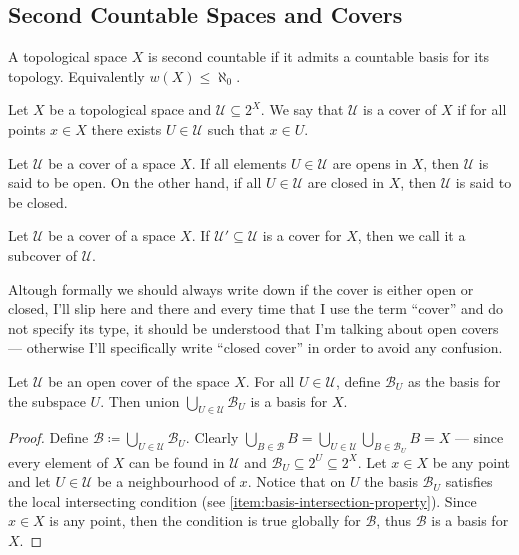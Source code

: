 \subsection{Second Countable Spaces and Covers}

\begin{definition}\label{def: second countable}
A topological space \(X\) is second countable if it admits a countable basis
for its topology. Equivalently \(w(X) \leq \aleph_0\).
\end{definition}

\begin{definition}[Cover]\label{def: cover}
Let \(X\) be a topological space and \(\mathcal U \subseteq 2^X\). We say that
\(\mathcal U\) is a cover of \(X\) if for all points \(x \in X\) there exists
\(U \in \mathcal U\) such that \(x \in U\).
\end{definition}

\begin{definition}
Let \(\mathcal U\) be a cover of a space \(X\). If all elements \(U \in
\mathcal U\) are opens in \(X\), then \(\mathcal U\) is said to be open. On
the other hand, if all \(U \in \mathcal U\) are closed in \(X\), then
\(\mathcal U\) is said to be closed.
\end{definition}

\begin{definition}[Subcover]
Let \(\mathcal U\) be a cover of a space \(X\). If \(\mathcal U' \subseteq
\mathcal U\) is a cover for \(X\), then we call it a subcover of \(\mathcal
U\).
\end{definition}

Altough formally we should always write down if the cover is either open or
closed, I'll slip here and there and every time that I use the term ``cover''
and do not specify its type, it should be understood that I'm talking about open
covers --- otherwise I'll specifically write ``closed cover'' in order to avoid
any confusion.

\begin{proposition}
\label{prop:union-cover-basis}
Let \(\mathcal U\) be an open cover of the space \(X\). For all \(U \in \mathcal
U\), define \(\mathcal{B}_U\) as the basis for the subspace \(U\). Then union
\(\bigcup_{U \in \mathcal U} \mathcal{B}_U\) is a basis for \(X\).
\end{proposition}

\begin{proof}
Define \(\mathcal B \coloneq \bigcup_{U \in \mathcal U} \mathcal B_{U}\).
Clearly \(\bigcup_{B \in \mathcal B} B = \bigcup_{U \in \mathcal U} \bigcup_{B
\in \mathcal B_U} B = X\) --- since every element of \(X\) can be found in
\(\mathcal U\) and \(\mathcal B_U \subseteq 2^U \subseteq 2^{X}\). Let \(x \in
X\) be any point and let \(U \in \mathcal U\) be a neighbourhood of
\(x\). Notice that on \(U\) the basis \(\mathcal B_U\) satisfies the local
intersecting condition (see \cref{item:basis-intersection-property}). Since \(x
\in X\) is any point, then the condition is true globally for \(\mathcal B\),
thus \(\mathcal B\) is a basis for \(X\).
\end{proof}

